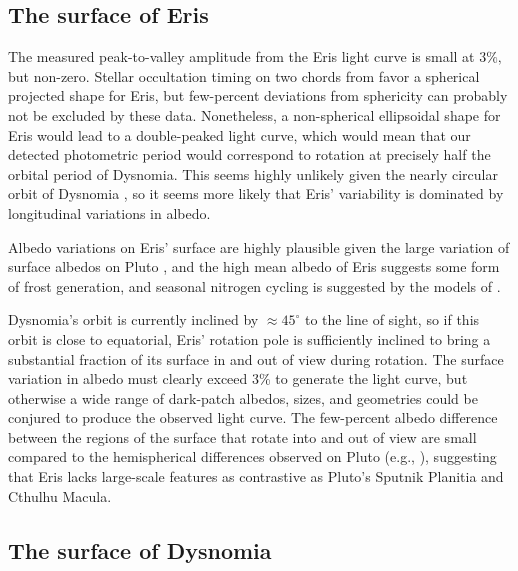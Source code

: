 \documentclass[onecolumn]{aastex631}
\begin{document}
\subsection{The surface of Eris}

The measured peak-to-valley amplitude from the Eris light curve is small at $3\%,$ but non-zero. Stellar occultation timing on two chords from \citet{Sicardy} favor a spherical projected shape for Eris, but few-percent deviations from sphericity can probably not be excluded by these data.  Nonetheless, a non-spherical ellipsoidal shape for Eris would lead to a double-peaked light curve, which would mean that our detected photometric period would correspond to rotation at precisely half the orbital period of Dysnomia.  This seems highly unlikely given the nearly circular orbit of Dysnomia \citep[$e<0.01$;][]{H21}, so it seems more likely that Eris' variability is dominated by longitudinal variations in albedo.

Albedo variations on Eris' surface are highly plausible given the large variation of surface albedos on Pluto \citep{Buratti17}, and the high mean albedo of Eris \citep[$p=0.96^{+0.09}_{-0.04},$][]{Sicardy} suggests some form of frost generation, and seasonal nitrogen cycling is suggested by the models of \citet{Hofgartner2019}.

Dysnomia's orbit is currently inclined by $\approx45^\circ$ to the line of sight, so if this orbit is close to equatorial, Eris' rotation pole is sufficiently inclined to bring a substantial fraction of its surface in and out of view during rotation. The surface variation in albedo must clearly exceed 3\% to generate the light curve, but otherwise a wide range of dark-patch albedos, sizes, and geometries could be conjured to produce the observed light curve. The few-percent albedo difference between the regions of the surface that rotate into and out of view are small compared to the hemispherical differences observed on Pluto (e.g., \citealt{Buratti17}), suggesting that Eris lacks large-scale features as contrastive as Pluto's Sputnik Planitia and Cthulhu Macula.

\subsection{The surface of Dysnomia}
\end{document}
